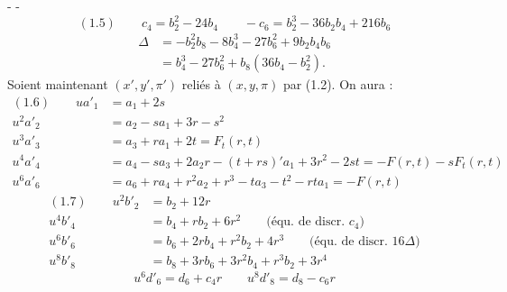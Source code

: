-  -
\[
(1.5)\qquad c_4=b_2^2-24b_4\qquad -c_6=b_2^3-36b_2b_4+216b_6
\]
\[
\begin{aligned}
\Delta&=-b_2^2b_8-8b_4^3-27b_6^2+9b_2b_4b_6\\
&=b_4^3-27b_6^2+b_8(36b_4-b_2^2).
\end{aligned}
\]
Soient maintenant $(x',y',\pi')$ reliés à $(x,y,\pi)$ par (1.2). On aura :
\[
\begin{aligned}
(1.6)\qquad ua'_1&=a_1+2s\\
u^2a'_2&=a_2-sa_1+3r-s^2\\
u^3a'_3&=a_3+ra_1+2t=F_t(r,t)\\
u^4a'_4&=a_4-sa_3+2a_2r-(t+rs)'a_1+3r^2-2st=-F(r,t)-sF_t(r,t)\\
u^6a'_6&=a_6+ra_4+r^2a_2+r^3-ta_3-t^2-rta_1=-F(r,t)
\end{aligned}
\]
\[
\begin{aligned}
(1.7)\qquad u^2b'_2&=b_2+12r\\
u^4b'_4&=b_4+rb_2+6r^2\qquad\text{(équ. de discr. }c_4\text{)}\\
u^6b'_6&=b_6+2rb_4+r^2b_2+4r^3\qquad\text{(équ. de discr. }16\Delta\text{)}\\
u^8b'_8&=b_8+3rb_6+3r^2b_4+r^3b_2+3r^4
\end{aligned}
\]
\[
u^6d'_6=d_6+c_4r\qquad u^8d'_8=d_8-c_6r
\]
